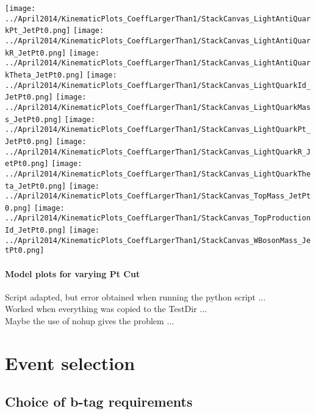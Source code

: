 \documentclass[a4paper,12pt]{report}
\begin{document}
\begin{center}
\texttt{[image: ../April2014/KinematicPlots\_CoeffLargerThan1/StackCanvas\_LightAntiQuarkPt\_JetPt0.png]}
\texttt{[image: ../April2014/KinematicPlots\_CoeffLargerThan1/StackCanvas\_LightAntiQuarkR\_JetPt0.png]}
\texttt{[image: ../April2014/KinematicPlots\_CoeffLargerThan1/StackCanvas\_LightAntiQuarkTheta\_JetPt0.png]}
\texttt{[image: ../April2014/KinematicPlots\_CoeffLargerThan1/StackCanvas\_LightQuarkId\_JetPt0.png]}
\texttt{[image: ../April2014/KinematicPlots\_CoeffLargerThan1/StackCanvas\_LightQuarkMass\_JetPt0.png]}
\texttt{[image: ../April2014/KinematicPlots\_CoeffLargerThan1/StackCanvas\_LightQuarkPt\_JetPt0.png]}
\texttt{[image: ../April2014/KinematicPlots\_CoeffLargerThan1/StackCanvas\_LightQuarkR\_JetPt0.png]}
\texttt{[image: ../April2014/KinematicPlots\_CoeffLargerThan1/StackCanvas\_LightQuarkTheta\_JetPt0.png]}
\texttt{[image: ../April2014/KinematicPlots\_CoeffLargerThan1/StackCanvas\_TopMass\_JetPt0.png]}
\texttt{[image: ../April2014/KinematicPlots\_CoeffLargerThan1/StackCanvas\_TopProductionId\_JetPt0.png]}
\texttt{[image: ../April2014/KinematicPlots\_CoeffLargerThan1/StackCanvas\_WBosonMass\_JetPt0.png]}
\end{center}

\subsubsection{Model plots for varying Pt Cut}
Script adapted, but error obtained when running the python script ...\\
Worked when everything was copied to the TestDir ...\\
Maybe the use of nohup gives the problem ...

\chapter{Event selection}

\section{Choice of b-tag requirements}
\end{document}
